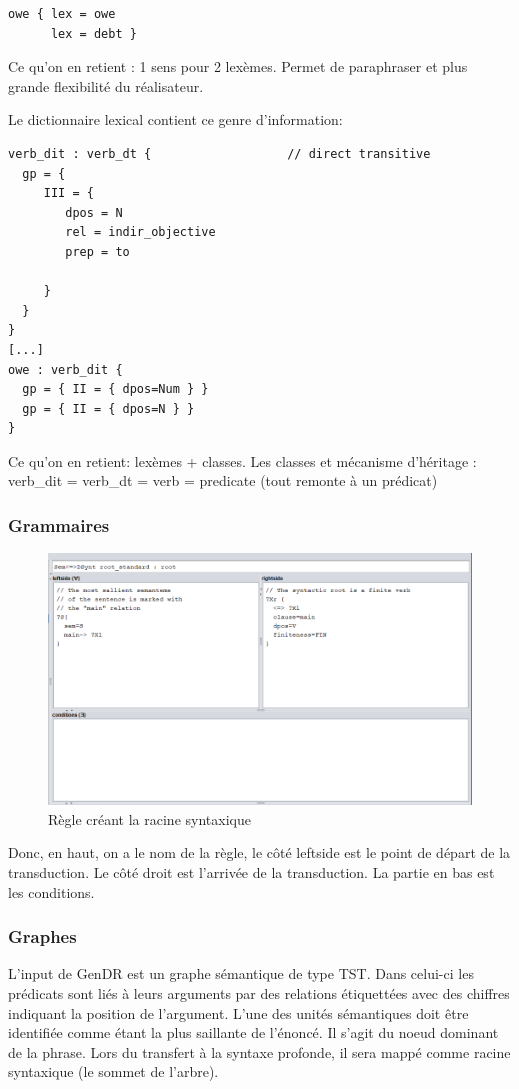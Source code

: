 \begin{lstlisting}[language=Xml, caption = semanticon]
owe { lex = owe
      lex = debt }
\end{lstlisting}
Ce qu'on en retient : 1 sens pour 2 lexèmes. Permet de paraphraser et plus grande flexibilité du réalisateur.

Le dictionnaire lexical contient ce genre d'information:
\begin{lstlisting}[language=Xml, caption = lexicon]
verb_dit : verb_dt {                   // direct transitive
  gp = {
     III = {
        dpos = N
        rel = indir_objective
        prep = to  

     }
  }
}
[...]
owe : verb_dit {
  gp = { II = { dpos=Num } }
  gp = { II = { dpos=N } }
}
\end{lstlisting}

Ce qu'on en retient: lexèmes + classes. Les classes et mécanisme d'héritage : verb\_dit = verb\_dt = verb = predicate (tout remonte à un prédicat)

\subsubsection{Grammaires}

\begin{figure}[htb]
	\centering
	\includegraphics[width=1\textwidth, trim = {0cm 0cm 0cm 0cm},clip]{ch3/figs/grammaire.png}
	\caption{Règle créant la racine syntaxique}
	\label{fig:root}
\end{figure}

Donc, en haut, on a le nom de la règle, le côté leftside est le point de départ de la transduction. Le côté droit est l'arrivée de la transduction. La partie en bas est les conditions.

\subsubsection{Graphes}\label{entree-sortie}
L'input de GenDR est un graphe sémantique de type TST. Dans celui-ci les prédicats sont liés à leurs arguments par des relations étiquettées avec des chiffres indiquant la position de l'argument. L'une des unités sémantiques doit être identifiée comme étant la plus saillante de l'énoncé. Il s'agit du noeud dominant de la phrase. Lors du transfert à la syntaxe profonde, il sera mappé comme racine syntaxique (le sommet de l'arbre).

